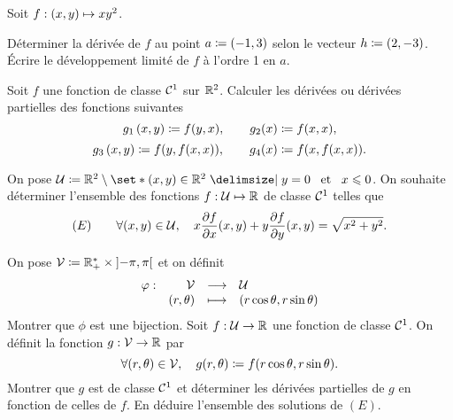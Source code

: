 \documentclass{magnolia}
\begin{document}

Soit $f:\left(x,y\right)\mapsto xy^2$.
\begin{questions}
\question Déterminer la dérivée de $f$ au point $a\coloneqq \left(-1,3\right)$ selon le vecteur
  $h\coloneqq \left(2,-3\right)$.
\question Écrire le développement limité de $f$ à l'ordre 1 en $a$.
\end{questions}
Soit $f$ une fonction de classe $\mathcal{C}^{1}$ sur $\mathbb{R}^2$. Calculer les dérivées
ou dérivées partielles des fonctions suivantes
\[g_1\left(x,y\right)\coloneqq f(y,x), \qquad g_2(x)\coloneqq f(x,x),\]
\[g_3\left(x,y\right)\coloneqq f(y,f(x,x)), \qquad g_4(x)\coloneqq f(x,f(x,x)).\]

On pose $\mathcal{U}\defeq\R^2\setminus\enstq{(x,y)\in\R^2}{y=0 \et x\leq 0}$. On souhaite
déterminer l'ensemble des fonctions $f:\mathcal{U}\mapsto\mathbb{R}$ de classe $\mathcal{C}^{1}$ telles que
\[(E) \qquad \forall (x,y)\in\mathcal{U} ,\quad
  x\frac{\partial f}{\partial x}(x,y)+y\frac{\partial f}{\partial y}(x,y)=
  \sqrt{x^2+y^2}.\]
\begin{questions}
\question On pose $\mathcal{V}\coloneqq \mathbb{R}_+^*\times\left]-\pi,\pi\right[$ et on définit
  \[\begin{array}[t]{lrcl} \displaystyle{\varphi} : & \displaystyle{\mathcal{V}} & \longrightarrow & \displaystyle{\mathcal{U}} \\ & \displaystyle{(r,\theta)} & \longmapsto & \displaystyle{(r\cos \theta,r \sin \theta)} \end{array}\]
  Montrer que $\phi$ est une bijection.
\question Soit $f:\mathcal{U}\to\mathbb{R}$ une fonction de classe $\mathcal{C}^{1}$. On
  définit la fonction $g:\mathcal{V}\to\mathbb{R}$ par
  \[\forall (r,\theta)\in\mathcal{V},\quad g(r,\theta)\coloneqq f(r\cos \theta,r\sin\theta).\]
  Montrer que $g$ est de classe $\mathcal{C}^{1}$ et déterminer les dérivées partielles de $g$ en fonction de celles de $f$.
\question En déduire l'ensemble des solutions de $(E)$.
\end{questions}


\end{document}

